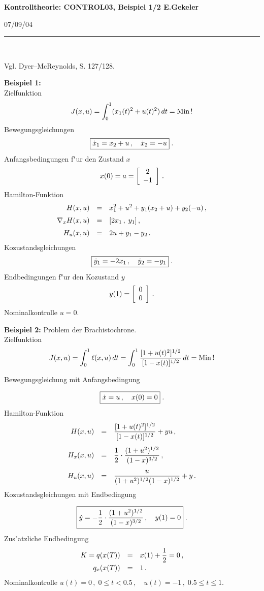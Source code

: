 \documentclass[12pt,a4paper,twoside]{article}
\newcommand{\Release}{07/09/04} %
\begin{document}
%
\addtolength{\abovedisplayskip}{-1ex}
\addtolength{\belowdisplayskip}{-1ex}
\addtolength{\abovedisplayshortskip}{-1ex}
\addtolength{\belowdisplayshortskip}{-1ex}
\setlength{\fboxsep}{2mm}
%

{\large\bf Kontrolltheorie: CONTROL03, Beispiel 1/2 \hfill E.Gekeler}
\par
\vspace{-1mm}
\hfill{\footnotesize\Release\ }
\par
\vspace{-2mm}
\rule{\textwidth}{1pt}\\
\par
\vspace{-3mm}
Vgl. {\sc Dyer--McReynolds}, S. 127/128.

{\bf Beispiel 1:}\\
Zielfunktion
\[
J(x,u) = \int_0^1(x_1(t)^2 + u(t)^2)\, dt = \Min\, !
\]
Bewegungsgleichungen
\[
\fbox{$
\dot{x}_1 = x_2 + u\,, \quad \dot{x}_2 = - u
$}\; .
\]
Anfangsbedingungen f"ur den Zustand $x$
\[
x(0) = a = \ba{[}{c}2\\-1\ea{]}\, .
\]
{\sc Hamilton}-Funktion
\[
\ba{.}{rcl}
H(x,u) &=& x_1^2 + u^2 + y_1(x_2 + u) + y_2(-u)\,,\\[2mm]
\nabla_x H(x,u) &=& [2x_1\,, \; y_1]\,,\\[2mm]
H_u(x,u) &=& 2u + y_1 -y_2\, .
\ea{.}
\]
Kozustandsgleichungen
\[
\fbox{$
\dot{y}_1 = -2x_1\,, \quad \dot{y}_2 = -y_1
$}\; .
\]
Endbedingungen f"ur den Kozustand $y$
\[
y(1) = \ba{[}{c}0\\0\ea{]}\,.
\]
Nominalkontrolle $u = 0$.
\par
\vspace{3mm}
{\bf Beispiel 2:} Problem der Brachistochrone.\\
Zielfunktion
\[
J(x,u) =
\int_0^1\ell(x,u)\, dt
= \int_0^1\frac{[1 + u(t)^2]^{1/2}}{[1 - x(t)]^{1/2}}\, dt = \Min \, !
\]

Bewegungsgleichung mit Anfangsbedingung

\[
\fbox{$
\dot{x} = u\,, \quad x(0) = 0
$}\; .
\]
{\sc Hamilton}-Funktion
\[
\ba{.}{rcl}
H(x,u) &=& \dis
\frac{[1 + u(t)^2]^{1/2}}{[1 - x(t)]^{1/2}} + yu\,,\\[5mm]
H_x(x,u) &=& \dis
\frac12\cdot \frac{(1+u^2)^{1/2}}{(1 - x)^{3/2}}\,,\\[5mm]
H_u(x,u) &=& \dis
\frac{u}{(1+u^2)^{1/2}(1 - x)^{1/2}} + y\,.
\ea{.}
\]
Kozustandsgleichungen mit Endbedingung

\[
\fbox{$
\dot{y}= \dis -
\frac12\cdot \frac{(1+u^2)^{1/2}}{(1 - x)^{3/2}}\,, \quad y(1) = 0
$}\; .
\]
Zus"atzliche Endbedingung
\[
\ba{.}{rcl}
K = q(x(T)) &=& \dis x(1) + \frac12 = 0\,,\\[2mm]
q_x(x(T))   &=&  1\,.
\ea{.}
\]
Nominalkontrolle $u(t) = 0\,, \; 0 \leq t < 0.5\,, \quad u(t) = - 1\,,\;
0.5 \leq t \leq 1$.
\end{document}
